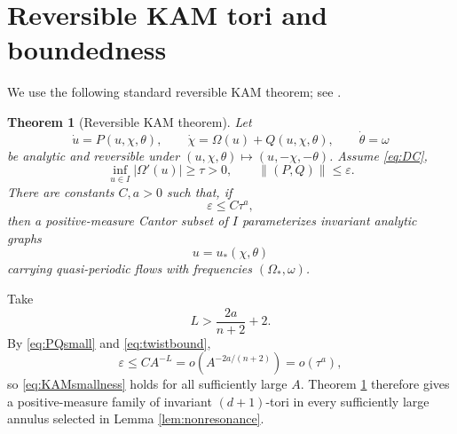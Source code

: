\documentclass[11pt]{amsart}
\newtheorem{theorem}{Theorem}[section]
\theoremstyle{remark}
\newcommand{\eps}{\varepsilon}
\newcommand{\norm}[1]{\lVert #1\rVert}
\begin{document}
\section{Reversible KAM tori and boundedness}

We use the following standard reversible KAM theorem; see
\cite{Moser1967,Sevryuk,Liu2005,LiQiYuan}.

\begin{theorem}[Reversible KAM theorem]\label{thm:KAM}
Let
\[
 \dot u=P(u,\chi,\theta),\qquad
 \dot\chi=\Omega(u)+Q(u,\chi,\theta),\qquad
 \dot\theta=\omega
\]
be analytic and reversible under
$(u,\chi,\theta)\mapsto(u,-\chi,-\theta)$.
Assume \eqref{eq:DC},
\[
 \inf_{u\in I}|\Omega'(u)|\geq\tau>0,
\qquad \norm{(P,Q)}\leq\eps.
\]
There are constants $C,a>0$ such that, if
\begin{equation}\label{eq:KAMsmallness}
 \eps\leq C\tau^a,
\end{equation}
then a positive-measure Cantor subset of $I$ parameterizes invariant
analytic graphs
\[
 u=u_*(\chi,\theta)
\]
carrying quasi-periodic flows with frequencies
$(\Omega_*,\omega)$.
\end{theorem}

Take
\begin{equation}\label{eq:Lchoice}
 L>\frac{2a}{n+2}+2.
\end{equation}
By \eqref{eq:PQsmall} and \eqref{eq:twistbound},
\[
 \eps\leq CA^{-L}
 =o\left(A^{-2a/(n+2)}\right)
 =o(\tau^a),
\]
so \eqref{eq:KAMsmallness} holds for all sufficiently large $A$.
Theorem \ref{thm:KAM} therefore gives a positive-measure family of
invariant $(d+1)$-tori in every sufficiently large annulus selected in
Lemma \ref{lem:nonresonance}.
\end{document}
